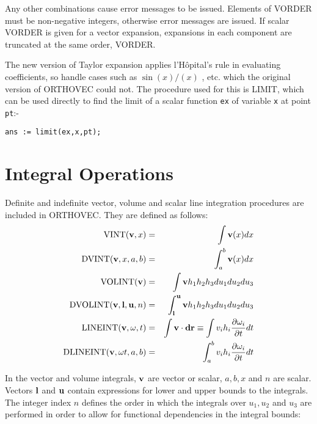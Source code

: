 Any other combinations cause error messages to be issued.  Elements of
VORDER must be non-negative integers, otherwise error messages are
issued.  If scalar VORDER is given for a vector expansion, expansions
in each component are truncated at the same order, VORDER.

The new version of Taylor expansion applies
l'H\^opital's rule in evaluating coefficients, so handle cases such as
$\sin(x) / (x) $ , etc.  which the original version of ORTHOVEC could
not. The procedure used for this is LIMIT, which can
be used directly to find the limit of a scalar function {\tt ex} of
variable {\tt x} at point {\tt pt}:-

\begin{verbatim}
ans := limit(ex,x,pt);
\end{verbatim}

\section{Integral Operations}
Definite and indefinite vector, volume and scalar line integration
procedures are included in ORTHOVEC.  They are defined as follows:
\begin{eqnarray*}
{\rm VINT} ({\bf v},x) & = & \int {\bf v}(x)dx\\
%
{\rm DVINT} ({\bf v},x, a, b) & = & \int^b_a {\bf v} (x) dx\\
%
{\rm VOLINT} ({\bf v}) & = & \int {\bf v} h_1 h_2 h_3 du_1 du_2 du_3\\
%
{\rm DVOLINT}({\bf v},{\bf l},{\bf u},n) & = & \int^{\bf u}_{\bf l}
{\bf v} h_1 h_2 h_3 du_1 du_2 du_3\\
%
{\rm LINEINT} ({\bf v, \omega}, t) & = & \int {\bf v} \cdot {\bf dr}
\equiv \int v_i h_i \frac{\partial \omega_i}{\partial t} dt\\
%
{\rm DLINEINT} ({\bf v, \omega} t, a, b) & = & \int^b_a v_i h_i
\frac{\partial \omega_i}{\partial t} dt\\
\end{eqnarray*}

In the vector and volume integrals, ${\bf v}$ are vector or scalar,
$a, b,x$ and $n$ are scalar.  Vectors ${\bf l}$ and ${\bf u}$ contain
expressions for lower and upper bounds to the integrals.  The integer
index $n$ defines the order in which the integrals over $u_1, u_2$ and
$u_3$ are performed in order to allow for functional dependencies in
the integral bounds:

